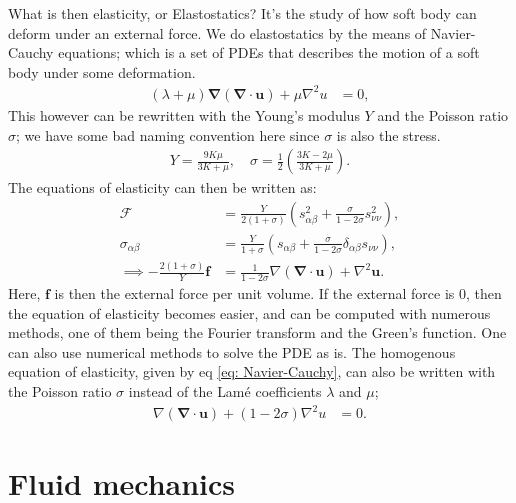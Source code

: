 \documentclass[a4paper]{article}
\newcommand{\dive}[1]{\mathbf{\nabla}\cdot \mathbf{#1}}
\newcommand{\laplace}{\nabla^2}
\newcommand{\f}{\mathcal{F}}
\begin{document}
\vspace*{0.5cm}\noindent
What is then elasticity, or Elastostatics? It's the study of how soft body can deform under an external force.
We do elastostatics by the means of Navier-Cauchy equations; which is a set of PDEs that describes the motion of a soft body under some deformation.
\begin{align}
    \left(\lambda + \mu\right)\mathbf{\nabla}\left(\dive{u}\right)+\mu\laplace{u} &=0, \label{eq: Navier-Cauchy}
\end{align}This however can be rewritten with the Young's modulus $Y$ and the Poisson ratio $\sigma$; we have some bad naming convention here since $\sigma$ is also the stress.
\begin{align*}
    Y = \frac{9K\mu}{3K + \mu}, \quad \sigma = \frac{1}{2}\left(\frac{3K - 2\mu}{3K + \mu}\right).
\end{align*}The equations of elasticity can then be written as:
\begin{align*}
    \f &= \frac{Y}{2(1 + \sigma)}\left(s_{\alpha\beta}^2+ \frac{\sigma}{1-2\sigma}s_{\nu\nu}^2\right),\\
    \sigma_{\alpha\beta}&= \frac{Y}{1+\sigma}\left(s_{\alpha\beta} + \frac{\sigma}{1-2\sigma}\delta_{\alpha\beta}s_{\nu\nu}\right),\\
    \implies -\frac{2(1+\sigma)}{Y}\mathbf{f} &= \frac{1}{1-2\sigma}\nabla\left(\dive{u}\right) + \nabla^2\mathbf{u}.
\end{align*}Here, $\mathbf{f}$ is then the external force per unit volume. If the external force is $0$, then the equation of elasticity becomes easier, and can be computed with numerous methods, one of them being the Fourier transform and the Green's function.
One can also use numerical methods to solve the PDE as is. The homogenous equation of elasticity, given by eq \eqref{eq: Navier-Cauchy}, can also be written with the Poisson ratio $\sigma$ instead of the Lamé coefficients $\lambda$ and $\mu$;
\begin{align*}
    \nabla\left(\dive{u}\right)+(1-2\sigma)\laplace{u} &= 0.
\end{align*}






\section{Fluid mechanics}\label{sec: Fluid mechanics}
\end{document}
